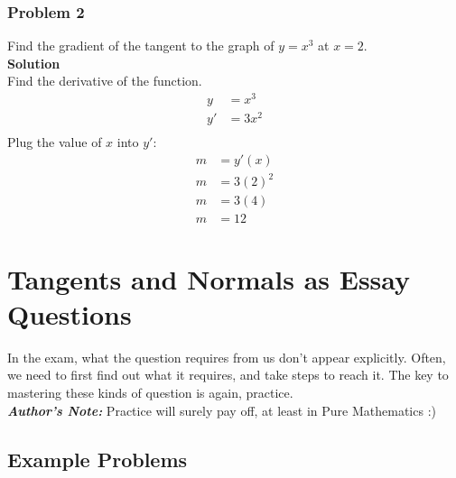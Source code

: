 \documentclass[hidelinks, a4paper, 12pt]{article}
\newcommand{\bd}{\textbf}
\newcommand{\n}{\\[\baselineskip]}
\begin{document}
            \subsubsection{Problem 2}
            Find the gradient of the tangent to the graph of $y = x^3$ at $x = 2$.\n
            \bd{Solution}\n
            Find the derivative of the function.
            \[\begin{split}
                y &= x^3\\
                y' &= 3x^2\\
            \end{split}\]
            Plug the value of $x$ into $y'$:
            \[\begin{split}
                m &= y'(x)\\
                m &= 3(2)^2\\
                m &= 3(4)\\
                m &= 12
            \end{split}\] 

    \section{Tangents and Normals as Essay Questions}
        In the exam, what the question requires from us don't appear explicitly. Often, we need to first find out what it
        requires, and take steps to reach it. The key to mastering these kinds of question is again, practice.\n
        \bd{\textit{Author's Note: }}Practice will surely pay off, at least in Pure Mathematics :)

        \subsection{Example Problems}
\end{document}
